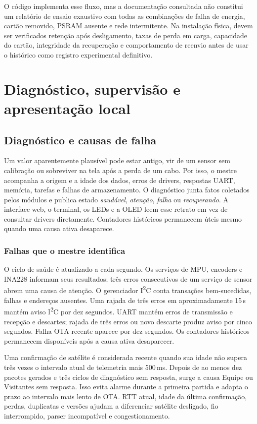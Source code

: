 O código implementa esse fluxo, mas a documentação consultada não constitui um relatório de ensaio exaustivo com todas as combinações de falha de energia, cartão removido, PSRAM ausente e rede intermitente. Na instalação física, devem ser verificados retenção após desligamento, taxas de perda em carga, capacidade do cartão, integridade da recuperação e comportamento de reenvio antes de usar o histórico como registro experimental definitivo.

\section{Diagnóstico, supervisão e apresentação local}\label{sec:diagnostico}
\subsection{Diagnóstico e causas de falha}
Um valor aparentemente plausível pode estar antigo, vir de um sensor sem calibração ou sobreviver na tela após a perda de um cabo. Por isso, o mestre acompanha a origem e a idade dos dados, erros de drivers, respostas UART, memória, tarefas e falhas de armazenamento. O diagnóstico junta fatos coletados pelos módulos e publica estado \emph{saudável}, \emph{atenção}, \emph{falha} ou \emph{recuperando}. A interface web, o terminal, os LEDs e a OLED leem esse retrato em vez de consultar drivers diretamente. Contadores históricos permanecem úteis mesmo quando uma causa ativa desaparece.

\subsubsection{Falhas que o mestre identifica}
O ciclo de saúde é atualizado a cada segundo. Os serviços de MPU, encoders e INA228 informam seus resultados; três erros consecutivos de um serviço de sensor abrem uma causa de atenção. O gerenciador I\textsuperscript{2}C conta transações bem-sucedidas, falhas e endereços ausentes. Uma rajada de três erros em aproximadamente 15\,s mantém aviso I\textsuperscript{2}C por dez segundos. UART mantém erros de transmissão e recepção e descartes; rajada de três erros ou novo descarte produz aviso por cinco segundos. Falha OTA recente aparece por dez segundos. Os contadores históricos permanecem disponíveis após a causa ativa desaparecer.

Uma confirmação de satélite é considerada recente quando sua idade não supera três vezes o intervalo atual de telemetria mais 500\,ms. Depois de ao menos dez pacotes gerados e três ciclos de diagnóstico sem resposta, surge a causa Equipe ou Visitantes sem resposta. Isso evita alarme durante a primeira partida e adapta o prazo ao intervalo mais lento de OTA. RTT atual, idade da última confirmação, perdas, duplicatas e versões ajudam a diferenciar satélite desligado, fio interrompido, parser incompatível e congestionamento.

